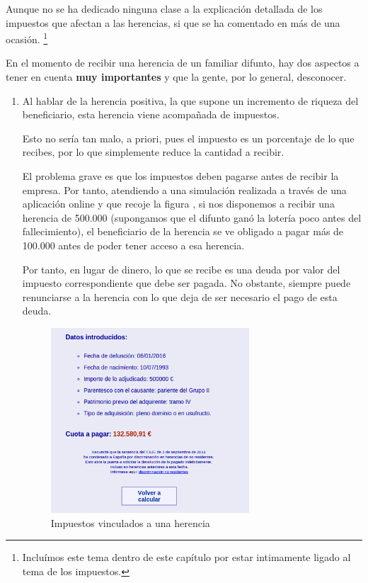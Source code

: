 \documentclass[nochap,palatino,shortheader]{apuntes}
\begin{document}
Aunque no se ha dedicado ninguna clase a la explicación detallada de los impuestos que afectan a las herencias, si que se ha comentado en más de una ocasión. \footnote{Incluímos este tema dentro de este capítulo por estar intimamente ligado al tema de los impuestos.}

En el momento de recibir una herencia de un familiar difunto, hay dos aspectos a tener en cuenta \textbf{muy importantes} y que la gente, por lo general, desconocer.

\begin{enumerate}
\item Al hablar de la herencia positiva, la que supone un incremento de riqueza del beneficiario, esta herencia viene acompañada de impuestos.

Esto no sería tan malo, a priori, pues el impuesto es un porcentaje de lo que recibes, por lo que simplemente reduce la cantidad a recibir.

El problema grave es que los impuestos deben pagarse antes de recibir la empresa. Por tanto, atendiendo a una simulación realizada a través de una aplicación online y que recoje la figura , si nos disponemos a recibir una herencia de 500.000 \texteuro (supongamos que el difunto ganó la lotería poco antes del fallecimiento), el beneficiario de la herencia se ve obligado a pagar más de 100.000 \texteuro antes de poder tener acceso a esa herencia.

Por tanto, en lugar de dinero, lo que se recibe es una deuda por valor del impuesto correspondiente que debe ser pagada. No obstante, siempre puede renunciarse a la herencia con lo que deja de ser necesario el pago de esta deuda.

\begin{figure}[hbtp]
\centering
\includegraphics[width=0.7\textwidth]{img/simulacion_sucesiones.png}
\caption{Impuestos vinculados a una herencia}
\label{fig:impuestoHerencia}
\end{figure}



\end{enumerate}
\end{document}
